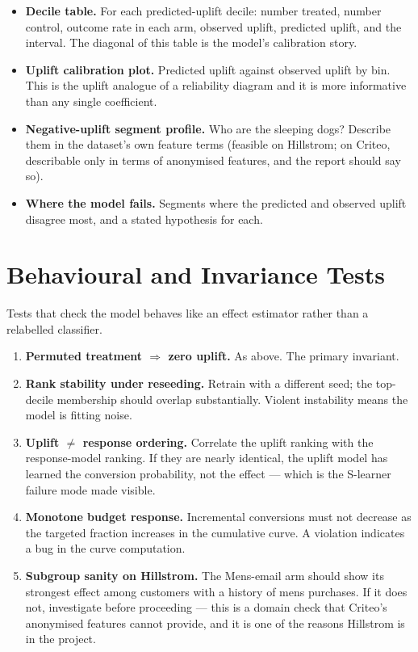 \documentclass[11pt,a4paper]{article}
\begin{document}
\begin{itemize}
\item \textbf{Decile table.} For each predicted-uplift decile: number treated, number control,
outcome rate in each arm, observed uplift, predicted uplift, and the interval. The diagonal of
this table is the model's calibration story.
\item \textbf{Uplift calibration plot.} Predicted uplift against observed uplift by bin. This is the
uplift analogue of a reliability diagram and it is more informative than any single coefficient.
\item \textbf{Negative-uplift segment profile.} Who are the sleeping dogs? Describe them in the
dataset's own feature terms (feasible on Hillstrom; on Criteo, describable only in terms of
anonymised features, and the report should say so).
\item \textbf{Where the model fails.} Segments where the predicted and observed uplift disagree
most, and a stated hypothesis for each.
\end{itemize}

\section{Behavioural and Invariance Tests}

Tests that check the model behaves like an effect estimator rather than a relabelled classifier.

\begin{enumerate}
\item \textbf{Permuted treatment $\Rightarrow$ zero uplift.} As above. The primary invariant.
\item \textbf{Rank stability under reseeding.} Retrain with a different seed; the top-decile
membership should overlap substantially. Violent instability means the model is fitting noise.
\item \textbf{Uplift $\neq$ response ordering.} Correlate the uplift ranking with the response-model
ranking. If they are nearly identical, the uplift model has learned the conversion probability, not
the effect --- which is the S-learner failure mode made visible.
\item \textbf{Monotone budget response.} Incremental conversions must not decrease as the targeted
fraction increases in the cumulative curve. A violation indicates a bug in the curve computation.
\item \textbf{Subgroup sanity on Hillstrom.} The Mens-email arm should show its strongest effect
among customers with a history of mens purchases. If it does not, investigate before proceeding ---
this is a domain check that Criteo's anonymised features cannot provide, and it is one of the
reasons Hillstrom is in the project.
\end{enumerate}
\end{document}
